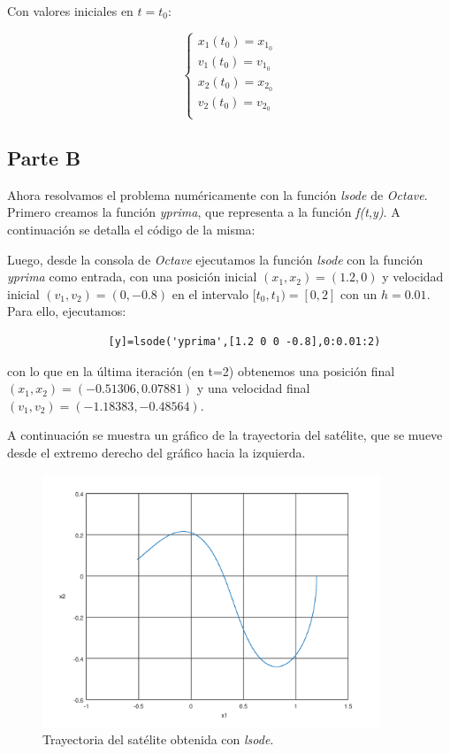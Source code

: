 \documentclass[titlepage,a4paper]{article}
\begin{document}
		Con valores iniciales en $t=t_{0}$:

		\begin{equation}
			\begin{cases}
				x_{1}(t_{0}) = x_{1_{0}}\\
				v_{1}(t_{0}) = v_{1_{0}}\\
				x_{2}(t_{0}) = x_{2_{0}}\\				
				v_{2}(t_{0}) = v_{2_{0}}\\
			\end{cases}
		\end{equation}

	\subsection{Parte B}\label{sec:parteB}
		Ahora resolvamos el problema numéricamente con la función \emph{lsode} de \emph{Octave}.		
		Primero creamos la función \emph{yprima}, que representa a la función \emph{f(t,y)}.
		A continuación se detalla el código de la misma:

		

		Luego, desde la consola de \emph{Octave} ejecutamos la función \emph{lsode} con la función 
		\emph{yprima} como entrada, con una posición inicial $(x_{1}, x_{2}) = (1.2, 0)$ y velocidad inicial 
		$(v_{1}, v_{2}) = (0, -0.8)$ en el intervalo $[t_{0}, t_{1}) = [0, 2]$ con un $h=0.01$.
		Para ello, ejecutamos:

			\begin{lstlisting}
				[y]=lsode('yprima',[1.2 0 0 -0.8],0:0.01:2)			
			\end{lstlisting}
		con lo que en la última iteración (en t=2) obtenemos una posición final 
		$(x_{1}, x_{2}) = (-0.51306, 0.07881)$ y una velocidad final $(v_{1}, v_{2}) = (-1.18383, -0.48564)$.

		A continuación se muestra un gráfico de la trayectoria del satélite, que se mueve desde el extremo
		derecho del gráfico hacia la izquierda.
		\begin{figure}[H]
			\centering
			\includegraphics[width=0.9\textwidth]{parteb.png}
			\caption{\label{fig:parteb}Trayectoria del satélite obtenida con \emph{lsode}.}
		\end{figure}
\end{document}

